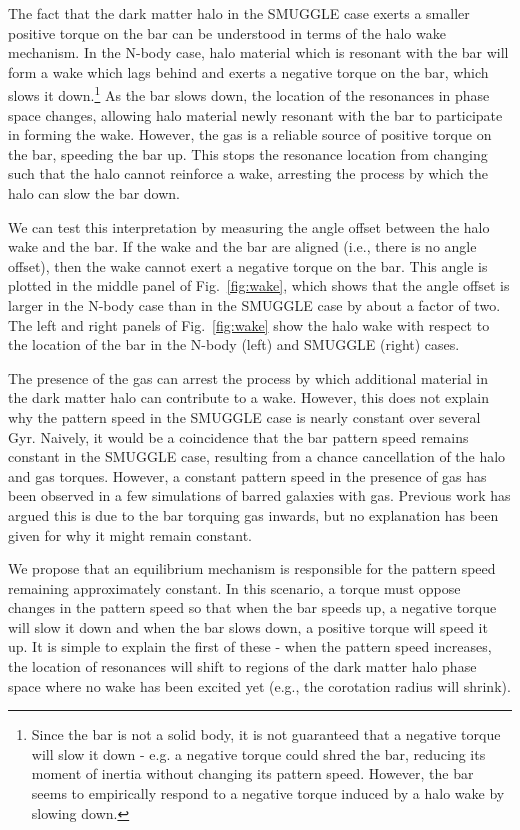 \documentclass{natureprintstyle}
\begin{document}
The fact that the dark matter halo in the SMUGGLE case exerts a smaller
positive torque on the bar can be understood in terms of the halo wake
mechanism. In the N-body case, halo material which is resonant with the bar
will form a wake which lags behind and exerts a negative torque on the bar,
which slows it down.\cite{1984MNRAS.209..729T, 1985MNRAS.213..451W,
1992ApJ...400...80H}\footnote{Since the bar is not a solid body, it is not
guaranteed that a negative torque will slow it down - e.g. a negative torque
could shred the bar, reducing its moment of inertia without changing its
pattern speed. However, the bar seems to empirically respond to a negative
torque induced by a halo wake by slowing down.} As the bar slows down, the
location of the resonances in phase space changes, allowing halo material
newly resonant with the bar to participate in forming the wake. However, the
gas is a reliable source of positive torque on the bar, speeding the bar up.
This stops the resonance location from changing such that the halo cannot
reinforce a wake, arresting the process by which the halo can slow the bar
down.

We can test this interpretation by measuring the angle offset between the halo
wake and the bar. If the wake and the bar are aligned (i.e., there is no angle
offset), then the wake cannot exert a negative torque on the bar. This angle
is plotted in the middle panel of Fig.~\ref{fig:wake}, which shows that the
angle offset is larger in the N-body case than in the SMUGGLE case by about a
factor of two. The left and right panels of Fig.~\ref{fig:wake} show the halo
wake with respect to the location of the bar in the N-body (left) and SMUGGLE
(right) cases.

The presence of the gas can arrest the process by which additional material in
the dark matter halo can contribute to a wake. However, this does not explain
why the pattern speed in the SMUGGLE case is nearly constant over several Gyr.
Naively, it would be a coincidence that the bar pattern speed remains constant
in the SMUGGLE case, resulting from a chance cancellation of the halo and gas
torques. However, a constant pattern speed in the presence of gas has been
observed in a few simulations of barred galaxies with
gas.\cite{1993AA...268...65F, 2010ApJ...719.1470V} Previous work has argued
this is due to the bar torquing gas inwards, but no explanation has been given
for why it might remain constant.

We propose that an equilibrium mechanism is responsible for the pattern speed
remaining approximately constant. In this scenario, a torque must oppose
changes in the pattern speed so that when the bar speeds up, a negative torque
will slow it down and when the bar slows down, a positive torque will speed it
up. It is simple to explain the first of these - when the pattern speed
increases, the location of resonances will shift to regions of the dark matter
halo phase space where no wake has been excited yet (e.g., the corotation
radius will shrink).
\end{document}
